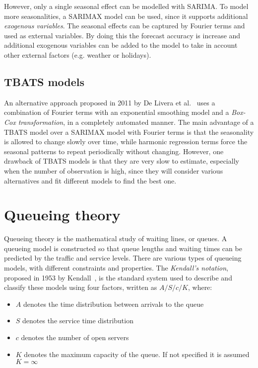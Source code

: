 However, only a single seasonal effect can be modelled with SARIMA. To model more seasonalities, a SARIMAX model can be used, since it supports additional \emph{exogenous variables}. The seasonal effects can be captured by Fourier terms and used as external variables. By doing this the forecast accuracy is increase and additional exogenous variables can be added to the model to take in account other external factors (e.g. weather or holidays).

\subsection{TBATS models}
\label{subsec:tbats_models}

An alternative approach proposed in 2011 by De Livera et al.~\cite{de_livera} uses a combination of Fourier terms with an exponential smoothing model and a \emph{Box-Cox transformation}, in a completely automated manner. The main advantage of a TBATS model over a SARIMAX model with Fourier terms is that the seasonality is allowed to change slowly over time, while harmonic regression terms force the seasonal patterns to repeat periodically without changing. However, one drawback of TBATS models is that they are very slow to estimate, especially when the number of observation is high, since they will consider various alternatives and fit different models to find the best one.

\section{Queueing theory}
\label{sec:queueing_theory}

Queueing theory is the mathematical study of waiting lines, or queues. A queueing model is constructed so that queue lengths and waiting times can be predicted by the traffic and service levels. There are various types of queueing models, with different constraints and properties. The \emph{Kendall's notation}, proposed in 1953 by Kendall~\cite{kendall}, is the standard system used to describe and classify these models using four factors, written as \( A/S/c/K \), where:
\begin{itemize}
  \item \( A \) denotes the time distribution between arrivals to the queue
  \item \( S \) denotes the service time distribution
  \item \( c \) denotes the number of open servers
  \item \( K \) denotes the maximum capacity of the queue. If not specified it is assumed \( K = \infty \)
\end{itemize}

